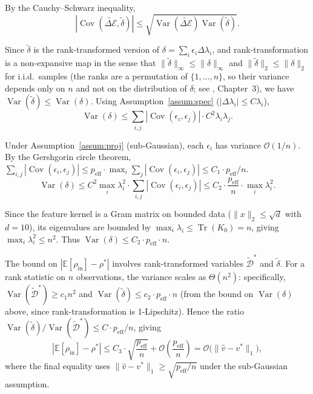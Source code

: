 \documentclass[twoside,11pt]{article}
\begin{document}
By the Cauchy--Schwarz inequality,
\[
|\operatorname{Cov}(\widetilde{\Delta\mathcal{E}}, \tilde{\delta})| \leq \sqrt{\operatorname{Var}(\widetilde{\Delta\mathcal{E}})\operatorname{Var}(\tilde{\delta})}.
\]

Since $\tilde{\delta}$ is the rank-transformed version of $\delta = \sum_i \epsilon_i \Delta\lambda_i$, and rank-transformation is a non-expansive map in the sense that $\|\tilde{\delta}\|_\infty \leq \|\delta\|_\infty$ and $\|\tilde{\delta}\|_2 \leq \|\delta\|_2$ for i.i.d.\ samples (the ranks are a permutation of $\{1,\dots,n\}$, so their variance depends only on $n$ and not on the distribution of $\delta$; see \citet{kendall1979rank}, Chapter~3), we have $\operatorname{Var}(\tilde{\delta}) \leq \operatorname{Var}(\delta)$.  Using Assumption~\ref{assum:spec} ($|\Delta\lambda_i| \leq C\lambda_i$),
\[
\operatorname{Var}(\delta) \leq \sum_{i,j} |\operatorname{Cov}(\epsilon_i, \epsilon_j)| \cdot C^2 \lambda_i \lambda_j.
\]

Under Assumption~\ref{assum:proj} (sub-Gaussian), each $\epsilon_i$ has variance $\mathcal{O}(1/n)$.  By the Gershgorin circle theorem, $\sum_{i,j} |\operatorname{Cov}(\epsilon_i, \epsilon_j)| \leq p_{\text{eff}} \cdot \max_i \sum_j |\operatorname{Cov}(\epsilon_i, \epsilon_j)| \leq C_1 \cdot p_{\text{eff}} / n$.
\[
\operatorname{Var}(\delta) \leq C^2 \max_i \lambda_i^2 \cdot \sum_{i,j} |\operatorname{Cov}(\epsilon_i, \epsilon_j)|
\leq C_2 \cdot \frac{p_{\text{eff}}}{n} \cdot \max_i \lambda_i^2.
\]

Since the feature kernel is a Gram matrix on bounded data ($\|x\|_2 \leq \sqrt{d}$ with $d=10$), its eigenvalues are bounded by $\max_i \lambda_i \leq \operatorname{Tr}(K_0) = n$, giving $\max_i \lambda_i^2 \leq n^2$.  Thus $\operatorname{Var}(\delta) \leq C_2 \cdot p_{\text{eff}} \cdot n$.

The bound on $|\mathbb{E}[\rho_{\text{in}}] - \rho^*|$ involves rank-transformed variables $\tilde{\mathcal{D}}^*$ and $\tilde{\delta}$.  For a rank statistic on $n$ observations, the variance scales as $\Theta(n^2)$: specifically, $\operatorname{Var}(\tilde{\mathcal{D}}^*) \geq c_1 n^2$ and $\operatorname{Var}(\tilde{\delta}) \leq c_2 \cdot p_{\text{eff}} \cdot n$ (from the bound on $\operatorname{Var}(\delta)$ above, since rank-transformation is 1-Lipschitz).  Hence the ratio $\operatorname{Var}(\tilde{\delta}) / \operatorname{Var}(\tilde{\mathcal{D}}^*) \leq C \cdot p_{\text{eff}} / n$, giving
\[
|\mathbb{E}[\rho_{\text{in}}] - \rho^*| \leq C_3 \cdot \sqrt{\frac{p_{\text{eff}}}{n}} + \mathcal{O}\!\left(\frac{p_{\text{eff}}}{n}\right) = \mathcal{O}\bigl(\|\hat{v} - v^*\|_1\bigr),
\]
where the final equality uses $\|\hat{v} - v^*\|_1 \geq \sqrt{p_{\text{eff}} / n}$ under the sub-Gaussian assumption.
\end{document}
